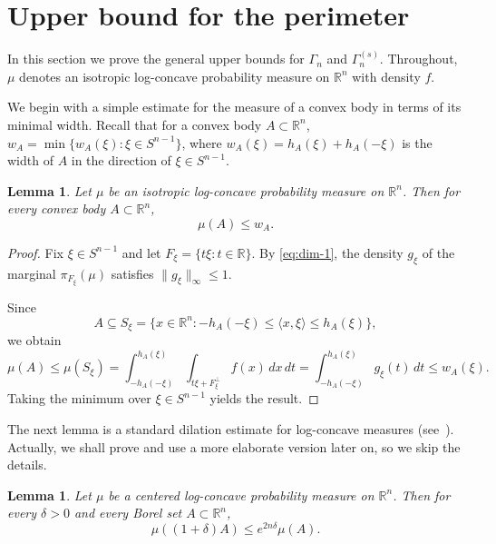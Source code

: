 \documentclass[11pt,leqno]{article}
\newtheorem{lemma}[theorem]{Lemma}
\theoremstyle{remark}
\numberwithin{equation}{section}
\newcommand{\ls}{\leqslant}
\begin{document}
\section{Upper bound for the perimeter}\label{section:4}


In this section we prove the general upper bounds for $\Gamma_n$ and $\Gamma_n^{(s)}$. Throughout, $\mu$ denotes 
an isotropic log-concave probability measure on $\mathbb{R}^n$ with density $f$.

\smallskip 

We begin with a simple estimate for the measure of a convex body in terms of its
minimal width. Recall that for a convex body $A\subset\mathbb{R}^n$,
$w_A=\min\{w_A(\xi):\xi\in S^{n-1}\}$, where $w_A(\xi)=h_A(\xi)+h_A(-\xi)$
is the width of $A$ in the direction of $\xi\in S^{n-1}$.

\begin{lemma}\label{lem:measure-width}Let $\mu$ be an isotropic log-concave probability measure on $\mathbb{R}^n$.
Then for every convex body $A\subset\mathbb{R}^n$,
$$\mu(A)\ls w_A.$$
\end{lemma}

\begin{proof}Fix $\xi\in S^{n-1}$ and let $F_{\xi}=\{t\xi:t\in\mathbb{R}\}$.
By \eqref{eq:dim-1}, the density $g_{\xi}$ of the marginal $\pi_{F_{\xi}}(\mu)$ satisfies
$\|g_{\xi}\|_{\infty}\ls 1$.

Since 
$$A\subseteq S_{\xi}=\{x\in\mathbb{R}^n:-h_A(-\xi)\ls\langle x,\xi\rangle \ls h_A(\xi)\},$$
we obtain
$$\mu(A)\ls\mu(S_{\xi})=\int_{-h_A(-\xi)}^{h_A(\xi)}\int_{t\xi +F_{\xi}^{\perp}}f(x)\,dx\,dt=\int_{-h_A(-\xi)}^{h_A(\xi)}g_{\xi}(t)\,dt
\ls w_A(\xi).$$
Taking the minimum over $\xi\in S^{n-1}$ yields the result.\end{proof}

\smallskip 

The next lemma is a standard dilation estimate for log-concave measures (see~\cite[Lemma~3.1]{Giannopoulos-Tziotziou-2025}). 
Actually, we shall prove and use a more elaborate version later on, so we skip the details.

\begin{lemma}\label{lem:dilation}Let $\mu$ be a centered log-concave probability measure on ${\mathbb R}^n$. Then for
every $\delta>0$ and every Borel set $A\subset\mathbb{R}^n$,
$$\mu((1+\delta)A)\ls e^{2n\delta }\mu(A).$$
\end{lemma}
\end{document}
